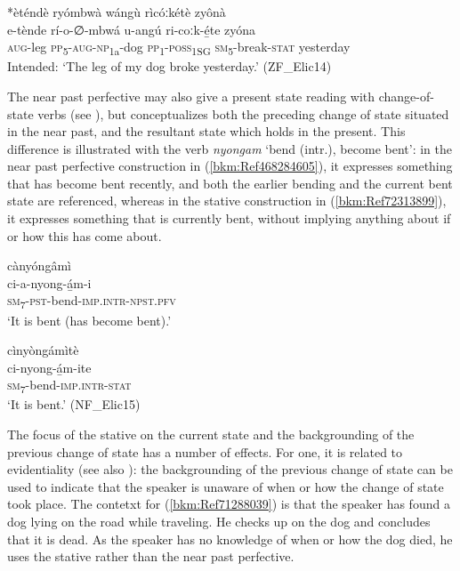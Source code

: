 \ea
\label{bkm:Ref490233472}
*èténdè ryómbwà wángù rìcóːkétè zyônà \\
\gll e-tènde  rí-o-∅-mbwá  u-angú  ri-coːk-é̲te    zyóna\\
\textsc{aug}-leg  \textsc{pp}\textsubscript{5}-\textsc{aug}-\textsc{np}\textsubscript{1a}-dog  \textsc{pp}\textsubscript{1}-\textsc{poss}\textsubscript{1SG}  \textsc{sm}\textsubscript{5}-break-\textsc{stat}  yesterday\\
Intended: ‘The leg of my dog broke yesterday.’ (ZF\_Elic14)
\z

The near past perfective may also give a present state reading with change-of-state verbs (see ), but conceptualizes both the preceding change of state situated in the near past, and the resultant state which holds in the present. This difference is illustrated with the verb \textit{nyongam} ‘bend (intr.), become bent’: in the near past perfective construction in (\ref{bkm:Ref468284605}), it expresses something that has become bent recently, and both the earlier bending and the current bent state are referenced, whereas in the stative construction in (\ref{bkm:Ref72313899}), it expresses something that is currently bent, without implying anything about if or how this has come about.

\ea
\label{bkm:Ref468284605}
\glll cànyóngâmì\\
ci-a-nyong-á̲m-i\\
\textsc{sm}\textsubscript{7}-\textsc{pst}-bend-\textsc{imp}.\textsc{intr}-\textsc{npst}.\textsc{pfv}\\
\glt ‘It is bent (has become bent).’
\z

\ea
\label{bkm:Ref72313899}
\glll cìnyòngámìtè\\
ci-nyong-á̲m-ite\\
\textsc{sm}\textsubscript{7}-bend-\textsc{imp}.\textsc{intr}-\textsc{stat}\\
\glt ‘It is bent.’ (NF\_Elic15)
\z

The focus of the stative on the current state and the backgrounding of the previous change of state has a number of effects. For one, it is related to evidentiality (see also \citealt{Crane2012}): the backgrounding of the previous change of state can be used to indicate that the speaker is unaware of when or how the change of state took place. The contetxt for (\ref{bkm:Ref71288039}) is that the speaker has found a dog lying on the road while traveling. He checks up on the dog and concludes that it is dead. As the speaker has no knowledge of when or how the dog died, he uses the stative rather than the near past perfective.

